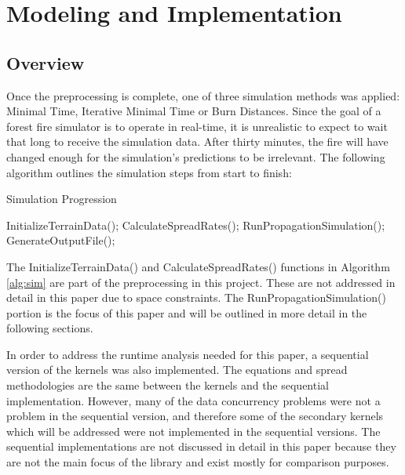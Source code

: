 \chapter{Modeling and Implementation}
\label{chapter:implementation}

\section{Overview}
Once the preprocessing is complete, one of three simulation methods was applied: Minimal Time, Iterative Minimal Time or Burn Distances. Since the goal of a forest fire simulator is to operate in real-time, it is unrealistic to expect to wait that long to receive the simulation data. After thirty minutes, the fire will have changed enough for the simulation's predictions to be irrelevant. The following algorithm outlines the simulation steps from start to finish:

\begin{algorithm}
  \caption{Simulation Progression}
  \label{alg:sim}
  \begin{algorithmic}
  \STATE InitializeTerrainData();
  \STATE CalculateSpreadRates();
  \STATE RunPropagationSimulation();
  \ENDWHILE  
  \STATE GenerateOutputFile();
  \end{algorithmic}
\end{algorithm}

The InitializeTerrainData() and CalculateSpreadRates() functions in Algorithm \ref{alg:sim} are part of the preprocessing in this project. These are not addressed in detail in this paper due to space constraints. The RunPropagationSimulation() portion is the focus of this paper and will be outlined in more detail in the following sections.

In order to address the runtime analysis needed for this paper, a sequential version of the kernels was also implemented. The equations and spread methodologies are the same between the kernels and the sequential implementation. However, many of the data concurrency problems were not a problem in the sequential version, and therefore some of the secondary kernels which will be addressed were not implemented in the sequential versions. The sequential implementations are not discussed in detail in this paper because they are not the main focus of the library and exist mostly for comparison purposes.  


